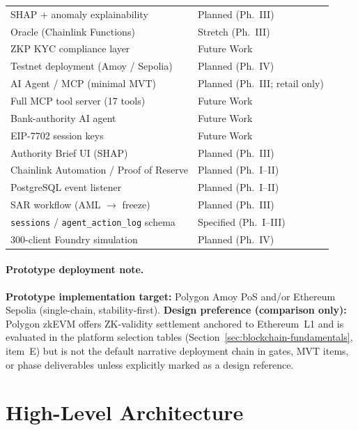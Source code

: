 \documentclass[12pt,a4paper]{report}
\newcommand{\tmarkPartial}{\faHourglassHalf}
\newcommand{\tmarkPlanned}{\textcolor{black!55}{\faCircle}}
\begin{document}
\begin{table}[H]
\begin{tabular}{@{}p{7.4cm}p{5.4cm}@{}}
\rowcolor{RowShade}
SHAP + anomaly explainability & \tmarkPlanned{} Planned (Ph.~III) \\
Oracle (Chainlink Functions) & \tmarkPlanned{} Stretch (Ph.~III) \\
\rowcolor{RowShade}
ZKP KYC compliance layer & \tmarkPlanned{} Future Work \\
Testnet deployment (Amoy / Sepolia) & \tmarkPlanned{} Planned (Ph.~IV) \\
\rowcolor{RowShade}
AI Agent / MCP (minimal MVT) & \tmarkPlanned{} Planned (Ph.~III; retail only) \\
Full MCP tool server (17 tools) & \tmarkPlanned{} Future Work \\
\rowcolor{RowShade}
Bank-authority AI agent & \tmarkPlanned{} Future Work \\
EIP-7702 session keys & \tmarkPlanned{} Future Work \\
Authority Brief UI (SHAP) & \tmarkPlanned{} Planned (Ph.~III) \\
\rowcolor{RowShade}
Chainlink Automation / Proof of Reserve & \tmarkPlanned{} Planned (Ph.~I--II) \\
PostgreSQL event listener & \tmarkPlanned{} Planned (Ph.~I--II) \\
\rowcolor{RowShade}
SAR workflow (AML $\to$ freeze) & \tmarkPlanned{} Planned (Ph.~III) \\
\texttt{sessions} / \texttt{agent\_action\_log} schema & \tmarkPartial{} Specified (Ph.~I--III) \\
\rowcolor{RowShade}
300-client Foundry simulation & \tmarkPlanned{} Planned (Ph.~IV) \\
\bottomrule
\end{tabular}
\end{table}
\endgroup

\paragraph{Prototype deployment note.}
\textbf{Prototype implementation target:} Polygon Amoy PoS and/or Ethereum Sepolia (single-chain, stability-first). \textbf{Design preference (comparison only):} Polygon zkEVM offers ZK-validity settlement anchored to Ethereum~L1 and is evaluated in the platform selection tables (Section~\ref{sec:blockchain-fundamentals}, item~E) but is not the default narrative deployment chain in gates, MVT items, or phase deliverables unless explicitly marked as a design reference.

\section{High-Level Architecture}
\label{sec:high-level-arch}
\end{document}

